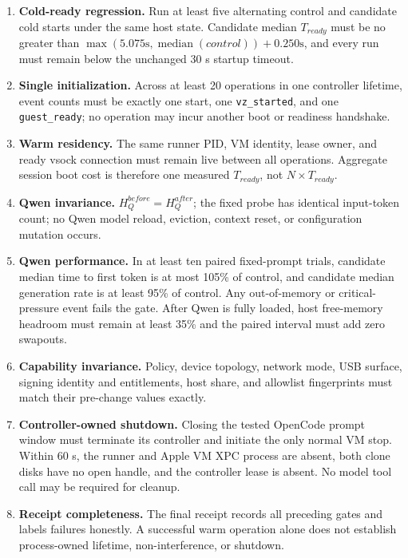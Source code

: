 \documentclass[10pt]{article}
\newcommand{\code}[1]{\texttt{#1}}
\begin{document}
\begin{enumerate}[label=G\arabic*.]
  \item \textbf{Cold-ready regression.} Run at least five alternating control
        and candidate cold starts under the same host state.  Candidate median
        \(T_{ready}\) must be no greater than
        \(\max(5.075\mathrm{s},\operatorname{median}(control))+0.250\mathrm{s}\),
        and every run must remain below the unchanged 30 s startup timeout.

  \item \textbf{Single initialization.} Across at least 20 operations in one
        controller lifetime, event counts must be exactly one start, one
        \code{vz\_started}, and one \code{guest\_ready}; no operation may incur
        another boot or readiness handshake.

  \item \textbf{Warm residency.} The same runner PID, VM identity, lease owner,
        and ready vsock connection must remain live between all operations.
        Aggregate session boot cost is therefore one measured \(T_{ready}\),
        not \(N\times T_{ready}\).

  \item \textbf{Qwen invariance.} \(H_Q^{before}=H_Q^{after}\); the fixed probe
        has identical input-token count; no Qwen model reload, eviction, context
        reset, or configuration mutation occurs.

  \item \textbf{Qwen performance.} In at least ten paired fixed-prompt trials,
        candidate median time to first token is at most 105\% of control, and
        candidate median generation rate is at least 95\% of control.  Any
        out-of-memory or critical-pressure event fails the gate.  After Qwen is
        fully loaded, host free-memory headroom must remain at least 35\% and
        the paired interval must add zero swapouts.

  \item \textbf{Capability invariance.} Policy, device topology, network mode,
        USB surface, signing identity and entitlements, host share, and allowlist
        fingerprints must match their pre-change values exactly.

  \item \textbf{Controller-owned shutdown.} Closing the tested OpenCode prompt
        window must terminate its controller and initiate the only normal VM
        stop.  Within 60 s, the runner and Apple VM XPC process are absent, both
        clone disks have no open handle, and the controller lease is absent.
        No model tool call may be required for cleanup.

  \item \textbf{Receipt completeness.} The final receipt records all preceding
        gates and labels failures honestly.  A successful warm operation alone
        does not establish process-owned lifetime, non-interference, or shutdown.
\end{enumerate}
\end{document}
